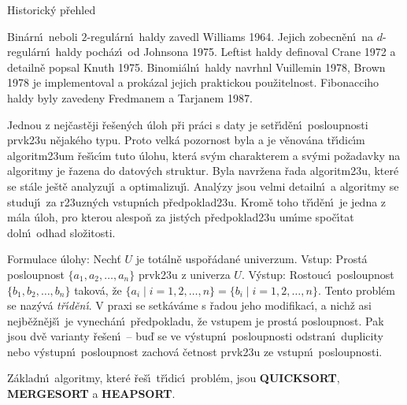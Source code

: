 \documentclass[a4paper,12pt]{article}
\begin{document}
\head
Historick\'y p\v rehled
\endhead

\flushpar Bin\'arn\'\i\ neboli $2$-regul\'arn\'\i\ haldy 
zavedl Williams 1964.  Jejich zobecn\v en\'\i\ na $d$-regul\'arn\'\i\ haldy 
poch\'az\'\i\ od Johnsona 1975.  Leftist haldy definoval Crane 1972 a 
detailn\v e popsal Knuth 1975.  Binomi\'aln\'\i\ haldy navrhnl Vuillemin 
1978, Brown 1978 je implementoval a prok\'azal jejich praktickou 
pou\v zitelnost.  Fibonacciho haldy byly zavedeny Fredmanem a 
Tarjanem 1987.  
\newpage

\centerline{}
\bigskip

\flushpar Jednou z nej\v cast\v eji \v re\v sen\'ych \'uloh p\v ri pr\'aci s 
daty je set\v r\'\i d\v en\'\i\ 
posloupnosti prvk\accent23u n\v ejak\'eho typu. Proto velk\'a pozornost byla a je v\v enov\'ana 
t\v r\'\i dic\'\i m algoritm\accent23um \v re\v s\'\i c\'\i m tuto \'ulohu, kter\'a 
sv\'ym charakterem a sv\'ymi 
po\v zadavky na algoritmy je \v razena do datov\'ych 
struktur. Byla navr\v zena \v rada algoritm\accent23u, kter\'e se 
st\'ale je\v st\v e analyzuj\'\i\ a optimalizuj\'\i . Anal\'yzy jsou velmi detailn\'\i\ a algoritmy se 
studuj\'\i\ za r\accent23uzn\'ych vstupn\'\i ch p\v redpoklad\accent23u. 
Krom\v e toho t\v r\'\i d\v en\'\i\ je jedna z m\'ala \'uloh, pro kterou 
alespo\v n za jist\'ych 
p\v redpoklad\accent23u um\'\i me spo\v c\'\i tat doln\'\i\ odhad slo\v zitosti.
\medskip

\flushpar Formulace \'ulohy:\newline 
Nech\v t $U$ je tot\'aln\v e uspo\v r\'adan\'e univerzum.\newline 
Vstup: Prost\'a posloupnost $\{a_1,a_2,\dots,a_n\}$ prvk\accent23u z 
univerza $U$.\newline 
V\'ystup: Rostouc\'\i\ posloupnost $\{b_1,b_2,\dots,b_n\}$ takov\'a, \v ze 
$\{a_i\mid i=1,2,\dots,n\}=\{b_i\mid i=1,2,\dots,n\}$.\newline 
Tento probl\'em se naz\'yv\'a \emph{t\v r\'\i d\v en\'\i}. 
V praxi se setk\'av\'ame s \v radou jeho modifikac\'\i , a nich\v z 
asi nejb\v e\v zn\v ej\v s\'\i\ je vynech\'an\'\i\ p\v redpokladu, \v ze 
vstupem je prost\'a posloupnost. Pak jsou dv\v e varianty 
\v re\v sen\'\i\ -- bu\v d se ve v\'ystupn\'\i\ posloupnosti odstran\'\i\ 
duplicity nebo v\'ystupn\'\i\ posloupnost zachov\'a \v cetnost prvk\accent23u ze 
vstupn\'\i\ posloupnosti.
\medskip

\flushpar Z\'akladn\'\i\ algoritmy, kter\'e  \v re\v s\'\i\ t\v r\'\i dic\'\i\ 
probl\'em, jsou {\bf QUICKSORT}, {\bf MERGESORT} a {\bf HEAP\-SORT}. 
\bigskip
\end{document}
